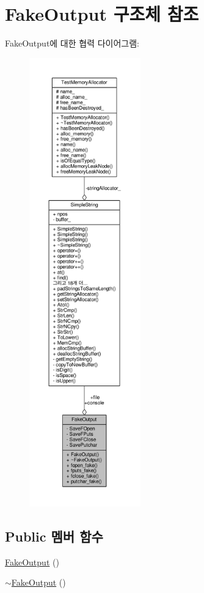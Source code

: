 \hypertarget{struct_fake_output}{}\section{Fake\+Output 구조체 참조}
\label{struct_fake_output}


Fake\+Output에 대한 협력 다이어그램\+:
\nopagebreak
\begin{figure}[H]
\begin{center}
\leavevmode
\includegraphics[height=550pt]{struct_fake_output__coll__graph}
\end{center}
\end{figure}
\subsection*{Public 멤버 함수}
\begin{DoxyCompactItemize}
\item 
\hyperlink{struct_fake_output_a65ea6804404bb8b3f0b0aecda62f511e}{Fake\+Output} ()
\item 
\hyperlink{struct_fake_output_afe231fe223b71b3d0f7b8237f902d757}{$\sim$\+Fake\+Output} ()
\end{DoxyCompactItemize}
